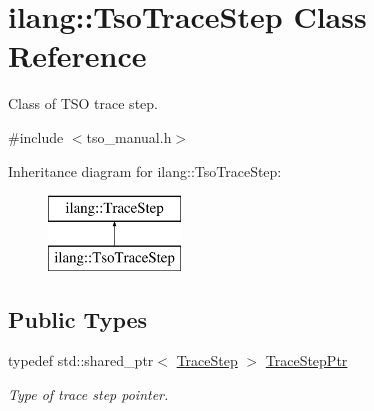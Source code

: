 \hypertarget{classilang_1_1_tso_trace_step}{}\section{ilang\+:\+:Tso\+Trace\+Step Class Reference}
\label{classilang_1_1_tso_trace_step}


Class of T\+SO trace step.  




{\ttfamily \#include $<$tso\+\_\+manual.\+h$>$}

Inheritance diagram for ilang\+:\+:Tso\+Trace\+Step\+:\begin{figure}[H]
\begin{center}
\leavevmode
\includegraphics[height=2.000000cm]{classilang_1_1_tso_trace_step}
\end{center}
\end{figure}
\subsection*{Public Types}
\begin{DoxyCompactItemize}
\item 
\mbox{\label{classilang_1_1_tso_trace_step_a9f0c567ad89c2567aca8cbe138474fea}} 
typedef std\+::shared\+\_\+ptr$<$ \mbox{\hyperlink{classilang_1_1_trace_step}{Trace\+Step}} $>$ \mbox{\hyperlink{classilang_1_1_tso_trace_step_a9f0c567ad89c2567aca8cbe138474fea}{Trace\+Step\+Ptr}}
\begin{DoxyCompactList}\small\item\em Type of trace step pointer. \end{DoxyCompactList}\end{DoxyCompactItemize}
